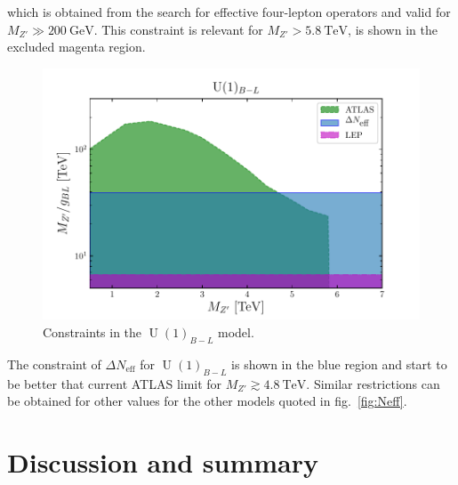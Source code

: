 \documentclass[12pt]{article}
\begin{document}
which is obtained from the search for effective four-lepton operators and valid for $M_{Z'}\gg 200\ \text{GeV}$. This constraint is relevant for $M_{Z'}>5.8\ \text{TeV}$, is shown in the excluded magenta region.

\begin{figure}
    \centering
    \includegraphics[scale=0.8]{u1blc}
    \caption{Constraints in the $\operatorname{U}(1)_{B-L}$ model.}
    \label{fig:u1blc}
\end{figure}

The constraint of $\Delta N_{\text{eff}}$ for $\operatorname{U}(1)_{B-L}$ is shown in the blue region and start to be better that current ATLAS limit for $M_{Z'}\gtrsim 4.8\ \text{TeV}$. Similar restrictions can be obtained for other values for the other models quoted in fig.~\ref{fig:Neff}.


\section{Discussion and summary}

\appendix



%
%
%

%

\end{document}
